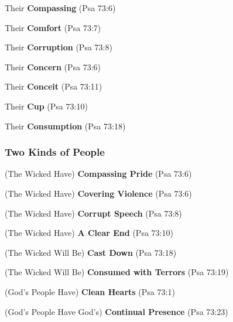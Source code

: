 \begin{compactenum}[I.][8]
    \item Their \textbf{Compassing} (Psa 73:6)
    \item Their \textbf{Comfort} (Psa 73:7)
    \item Their \textbf{Corruption} (Psa 73:8)
    \item Their \textbf{Concern} (Psa 73:6)
    \item Their \textbf{Conceit} (Psa 73:11)
    \item Their \textbf{Cup} (Psa 73:10)
    \item Their \textbf{Consumption} (Psa 73:18)
\end{compactenum}


\subsubsection{Two Kinds of People}

\begin{compactenum}[I.]
    \item (The Wicked Have) \textbf{Compassing Pride} (Psa 73:6)
    \item (The Wicked Have) \textbf{Covering Violence} (Psa 73:6)
    \item (The Wicked Have) \textbf{Corrupt Speech} (Psa 73:8)
    \item (The Wicked Have) \textbf{A Clear End} (Psa 73:10)
    \item (The Wicked Will Be) \textbf{Cast Down} (Psa 73:18)
    \item (The Wicked Will Be) \textbf{Consumed with Terrors} (Psa 73:19)
    \item (God's People Have) \textbf{Clean Hearts} (Psa 73:1)
    \item (God's People Have God's) \textbf{Continual Presence} (Psa 73:23)
\end{compactenum}
